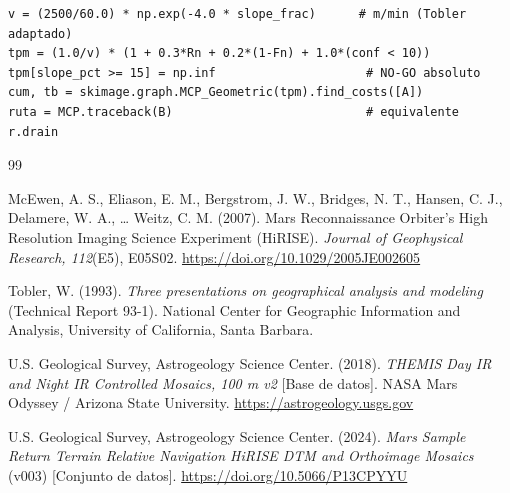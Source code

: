 \documentclass{article}
\begin{document}
\begin{lstlisting}[style=estiloPython]
v = (2500/60.0) * np.exp(-4.0 * slope_frac)      # m/min (Tobler adaptado)
tpm = (1.0/v) * (1 + 0.3*Rn + 0.2*(1-Fn) + 1.0*(conf < 10))
tpm[slope_pct >= 15] = np.inf                     # NO-GO absoluto
cum, tb = skimage.graph.MCP_Geometric(tpm).find_costs([A])
ruta = MCP.traceback(B)                           # equivalente r.drain
\end{lstlisting}

\newpage

\begin{thebibliography}{99}

McEwen, A. S., Eliason, E. M., Bergstrom, J. W., Bridges, N. T., Hansen, C. J., Delamere, W. A., \ldots{} Weitz, C. M. (2007). Mars Reconnaissance Orbiter's High Resolution Imaging Science Experiment (HiRISE). \emph{Journal of Geophysical Research, 112}(E5), E05S02. \url{https://doi.org/10.1029/2005JE002605}

Tobler, W. (1993). \emph{Three presentations on geographical analysis and modeling} (Technical Report 93-1). National Center for Geographic Information and Analysis, University of California, Santa Barbara.

U.S. Geological Survey, Astrogeology Science Center. (2018). \emph{THEMIS Day IR and Night IR Controlled Mosaics, 100 m v2} [Base de datos]. NASA Mars Odyssey / Arizona State University. \url{https://astrogeology.usgs.gov}

U.S. Geological Survey, Astrogeology Science Center. (2024). \emph{Mars Sample Return Terrain Relative Navigation HiRISE DTM and Orthoimage Mosaics} (v003) [Conjunto de datos]. \url{https://doi.org/10.5066/P13CPYYU}

\end{thebibliography}
\end{document}
